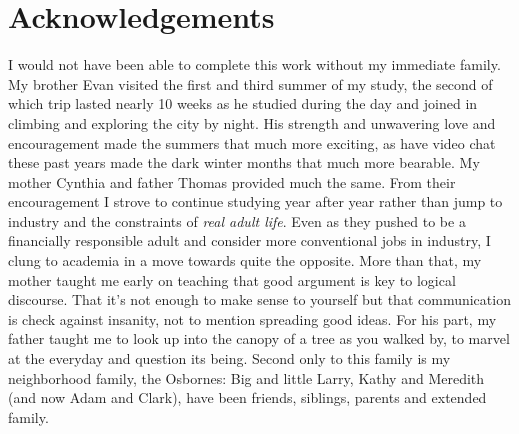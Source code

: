 

\chapter{Acknowledgements}

I would not have been able to complete this work without my immediate family. My brother Evan visited the first and third summer of my study, the second of which trip lasted nearly 10 weeks as he studied during the day and joined in climbing and exploring the city by night. His strength and unwavering love and encouragement made the summers that much more exciting, as have video chat these past years made the dark winter months that much more bearable. My mother Cynthia and father Thomas provided much the same. From their encouragement I strove to continue studying year after year rather than jump to industry and the constraints of \emph{real adult life}. Even as they pushed to be a financially responsible adult and consider more conventional jobs in industry, I clung to academia in a move towards quite the opposite. More than that, my mother taught me early on teaching that good argument is key to logical discourse. That it's not enough to make sense to yourself but that communication is check against insanity, not to mention spreading good ideas. For his part, my father taught me to look up into the canopy of a tree as you walked by, to marvel at the everyday and question its being. Second only to this family is my neighborhood family, the Osbornes: Big and little Larry, Kathy and Meredith (and now Adam and Clark), have been friends, siblings, parents and extended family.

